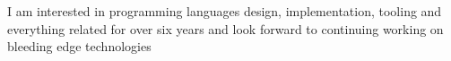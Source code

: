 I am interested in programming languages design, implementation, tooling and everything related for over six years and look forward to continuing working on bleeding edge technologies
